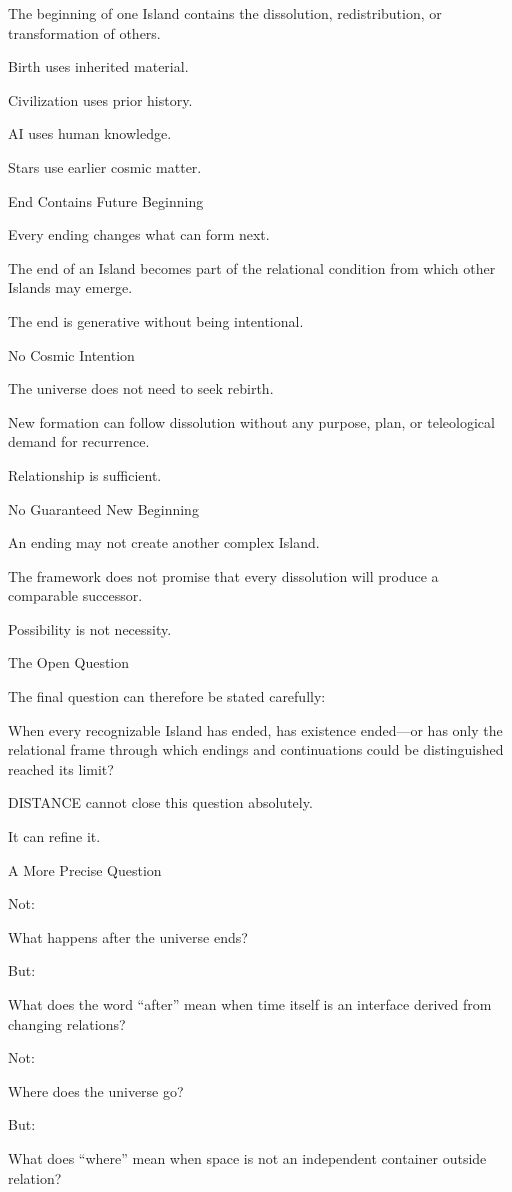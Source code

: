 The beginning of one Island contains the dissolution, redistribution, or transformation of others.

Birth uses inherited material.

Civilization uses prior history.

AI uses human knowledge.

Stars use earlier cosmic matter.

End Contains Future Beginning

Every ending changes what can form next.

The end of an Island becomes part of the relational condition from which other Islands may emerge.

The end is generative without being intentional.

No Cosmic Intention

The universe does not need to seek rebirth.

New formation can follow dissolution without any purpose, plan, or teleological demand for recurrence.

Relationship is sufficient.

No Guaranteed New Beginning

An ending may not create another complex Island.

The framework does not promise that every dissolution will produce a comparable successor.

Possibility is not necessity.

The Open Question

The final question can therefore be stated carefully:

When every recognizable Island has ended, has existence ended—or has only the relational frame through which endings and continuations could be distinguished reached its limit?

DISTANCE cannot close this question absolutely.

It can refine it.

A More Precise Question

Not:

What happens after the universe ends?

But:

What does the word “after” mean when time itself is an interface derived from changing relations?

Not:

Where does the universe go?

But:

What does “where” mean when space is not an independent container outside relation?

